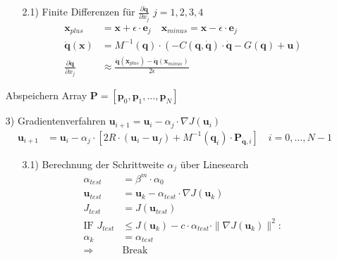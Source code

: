 \documentclass[a4paper, 12pt]{scrartcl}
\begin{document}
\begin{itemize}
\begin{itemize}
        \item[2.1)] Finite Differenzen für $\frac{\partial \ddot{\bm{q}}}{\partial x_j}$ $j=1,2,3,4$
        \begin{align*}
            \bm{x}_{plus}  &= \bm{x} + \epsilon \cdot \bm{e}_j
            \quad
            \bm{x}_{minus}  = \bm{x} - \epsilon \cdot \bm{e}_j
            \\
            \ddot{\bm{q}}(\bm{x}) 
            &= M^{-1}(\bm{q}) 
            \cdot ( - C(\bm{q},\bm{\dot{q}}) \cdot \bm{\dot{q}} - G(\bm{q}) + \bm{u} ) \\
            \frac{\partial \ddot{\bm{q}}}{\partial x_j}
            &\approx
            \frac{\ddot{\bm{q}}(\bm{x}_{plus}) - \ddot{\bm{q}}(\bm{x}_{minus})}{2 \epsilon}
        \end{align*}
    \end{itemize}
    Abspeichern Array $\bm{P} = [\bm{p}_0, \bm{p}_1, \ldots, \bm{p}_N]$
    \item[3)] Gradientenverfahren 
    $\bm{u}_{i+1} = \bm{u}_i - \alpha_j \cdot \nabla J(\bm{u}_i)$
    \begin{align*}
        \bm{u}_{i+1} &= \bm{u}_i - \alpha_j \cdot 
        \left[
            2 R \cdot (\bm{u}_i - \bm{u}_f) + M^{-1}(\bm{q}_i) \cdot \bm{P}_{\bm{\dot{q}},i}
        \right]
        \quad i = 0, \ldots, N-1    
    \end{align*}
        \begin{itemize}
            \item[3.1)] Berechnung der Schrittweite $\alpha_j$ über Linesearch
            \begin{align*}
                \alpha_{test} &= \beta^m \cdot \alpha_0 \\
                \bm{u}_{test} &= \bm{u}_k - \alpha_{test} \cdot \nabla J(\bm{u}_k) \\
                J_{test} &= J(\bm{u}_{test})  
                \\
                \text{IF } J_{test} &\leq J(\bm{u}_k) - c \cdot \alpha_{test} \cdot \|\nabla J(\bm{u}_k)\|^2: \\
                    \alpha_k &= \alpha_{test} \\
                    \Rightarrow &\text{Break}
            \end{align*}
        \end{itemize}
\end{itemize}

\newpage
\end{document}
